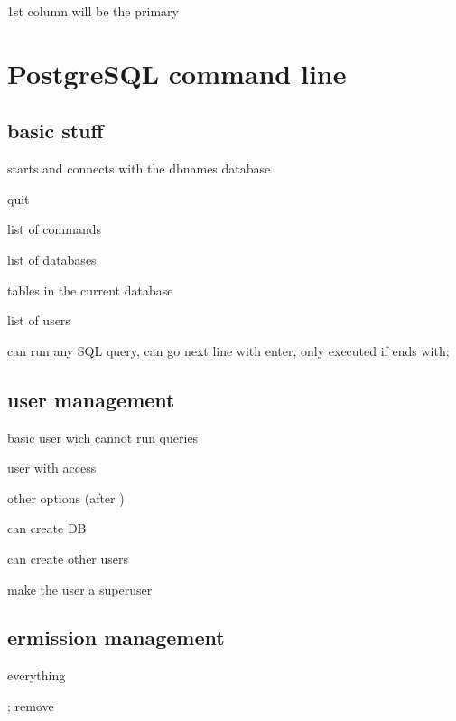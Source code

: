 
		1st column will be the primary






\section{PostgreSQL command line}

	\subsection{basic stuff}
	

		 starts and connects with the dbnames database

		 quit

		 list of commands

		 list of databases

		 tables in the current database

		 list of users

		can run any SQL query, can go next line with enter, only executed if ends with;

	\subsection{user management}

		 basic user wich cannot run queries

		 user with access

		other options (after )

		 can create DB

		 can create other users

		 make the user a superuser

	\subsection{ermission management}

		
		 everything 

		; remove


